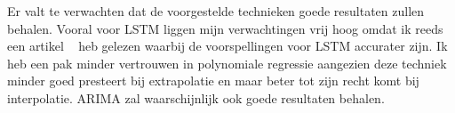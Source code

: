 Er valt te verwachten dat de voorgestelde technieken goede resultaten zullen behalen. Vooral voor LSTM liggen mijn verwachtingen vrij hoog omdat ik reeds een artikel ~\autocite{Siami-Namini2018} heb gelezen waarbij de voorspellingen voor LSTM accurater zijn. Ik heb een pak minder vertrouwen in polynomiale regressie aangezien deze techniek minder goed presteert bij extrapolatie en maar beter tot zijn recht komt bij interpolatie. ARIMA zal waarschijnlijk ook goede resultaten behalen.

